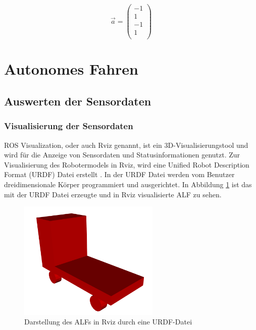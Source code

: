 		\begin{equation}
		\vec{a} = \left(
		\begin{array}{r}
		-1\\
	    1\\
		-1\\
		1\\
		\end{array}\right)
		\end{equation}
			
	\section{Autonomes Fahren}
	\label{sec:Autonomes Fahren}

		\subsection{Auswerten der Sensordaten}
		\label{subsec: Auswerten der Sensordaten}
		
			\subsubsection{Visualisierung der Sensordaten}
			\label{subsubsec: Visualisierung der Sensordaten}
			
			ROS Visualization, oder auch Rviz genannt, ist ein 3D-Visualisierungstool und wird für die Anzeige von Sensordaten und Statusinformationen genutzt. Zur Visualisierung des Robotermodels in Rviz, wird eine Unified Robot Description Format (URDF) Datei erstellt \cite{urdf}. In der URDF Datei werden vom Benutzer dreidimensionale Körper programmiert und ausgerichtet. In Abbildung \ref{fig: URDF} ist das mit der URDF Datei erzeugte und in Rviz visualisierte ALF zu sehen.
			
			\begin{figure}[H]
				\centering
				\includegraphics[width=0.6\textwidth]{Bilder/urdf.png}
				\caption{Darstellung des ALFs in Rviz durch eine URDF-Datei}
				\label{fig: URDF}
			\end{figure}
			
